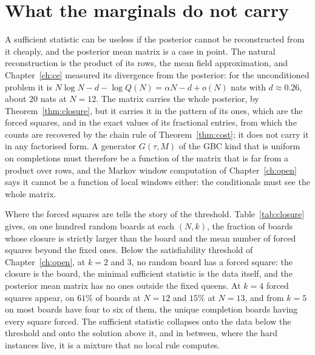 \section{What the marginals do not carry}

A sufficient statistic can be useless if the posterior cannot be reconstructed from it cheaply, and the posterior mean matrix is a case in point. The natural reconstruction is the product of its rows, the mean field approximation, and Chapter~\ref{ch:ce} measured its divergence from the posterior: for the unconditioned problem it is $N \log N - d - \log Q(N) = \alpha N - d + o(N)$ nats with $d \approx 0.26$, about $20$ nats at $N = 12$. The matrix carries the whole posterior, by Theorem~\ref{thm:closure}, but it carries it in the pattern of its ones, which are the forced squares, and in the exact values of its fractional entries, from which the counts are recovered by the chain rule of Theorem~\ref{thm:cost}; it does not carry it in any factorised form. A generator $G(\tau, M)$ of the GBC kind that is uniform on completions must therefore be a function of the matrix that is far from a product over rows, and the Markov window computation of Chapter~\ref{ch:open} says it cannot be a function of local windows either: the conditionals must see the whole matrix.

Where the forced squares are tells the story of the threshold. Table~\ref{tab:closure} gives, on one hundred random boards at each $(N, k)$, the fraction of boards whose closure is strictly larger than the board and the mean number of forced squares beyond the fixed ones. Below the satisfiability threshold of Chapter~\ref{ch:open}, at $k = 2$ and $3$, no random board has a forced square: the closure is the board, the minimal sufficient statistic is the data itself, and the posterior mean matrix has no ones outside the fixed queens. At $k = 4$ forced squares appear, on $61\%$ of boards at $N = 12$ and $15\%$ at $N = 13$, and from $k = 5$ on most boards have four to six of them, the unique completion boards having every square forced. The sufficient statistic collapses onto the data below the threshold and onto the solution above it, and in between, where the hard instances live, it is a mixture that no local rule computes.

